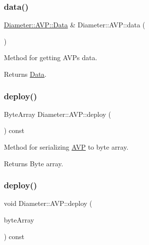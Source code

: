 \subsubsection{\texorpdfstring{data()}{data()}\hspace{0.1cm}{\footnotesize\ttfamily [2/2]}}
{\footnotesize\ttfamily \hyperlink{classDiameter_1_1AVP_1_1Data}{Diameter\+::\+A\+V\+P\+::\+Data} \& Diameter\+::\+A\+V\+P\+::data (\begin{DoxyParamCaption}{ }\end{DoxyParamCaption})}



Method for getting A\+V\+Ps data. 

\begin{DoxyReturn}{Returns}
\hyperlink{classDiameter_1_1AVP_1_1Data}{Data}. 
\end{DoxyReturn}
\mbox{\label{classDiameter_1_1AVP_acb802bb9d8980848852b226c26bf4cb1}} 
\subsubsection{\texorpdfstring{deploy()}{deploy()}\hspace{0.1cm}{\footnotesize\ttfamily [1/2]}}
{\footnotesize\ttfamily Byte\+Array Diameter\+::\+A\+V\+P\+::deploy (\begin{DoxyParamCaption}{ }\end{DoxyParamCaption}) const}



Method for serializing \hyperlink{classDiameter_1_1AVP}{A\+VP} to byte array. 

\begin{DoxyReturn}{Returns}
Byte array. 
\end{DoxyReturn}
\mbox{\label{classDiameter_1_1AVP_a9ac8102ba4fdc09a1df4904b4517c3d3}} 
\subsubsection{\texorpdfstring{deploy()}{deploy()}\hspace{0.1cm}{\footnotesize\ttfamily [2/2]}}
{\footnotesize\ttfamily void Diameter\+::\+A\+V\+P\+::deploy (\begin{DoxyParamCaption}\item[{Byte\+Array \&}]{byte\+Array }\end{DoxyParamCaption}) const}



